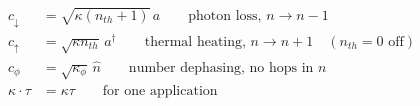 \documentclass[12pt]{article}
\begin{document}
\fontsize{22}{28}\selectfont
\begin{align*}
c_\downarrow &= \sqrt{\kappa(n_{th}+1)}\,a
      \qquad\text{photon loss, }n\to n-1 \\[0.45em]
c_\uparrow &= \sqrt{\kappa n_{th}}\,a^\dagger
      \qquad\text{thermal heating, }n\to n+1
      \quad(n_{th}=0\text{ off}) \\[0.45em]
c_\phi &= \sqrt{\kappa_\phi}\,\hat{n}
      \qquad\text{number dephasing, no hops in }n \\[0.45em]
\kappa\cdot\tau &= \kappa\tau
      \qquad\text{for one application}
\end{align*}
\end{document}
